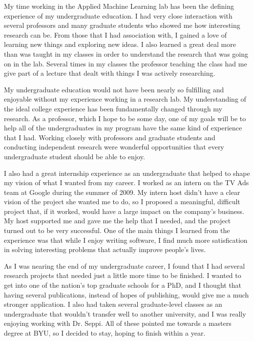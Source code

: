 \documentclass[onecolumn, 12pt]{article}
\begin{document}
My time working in the Applied Machine Learning lab has been the defining
experience of my undergraduate education.  I had very close interaction with
several professors and many graduate students who showed me how interesting
research can be.  From those that I had association with, I gained a love of
learning new things and exploring new ideas.  I also learned a great deal more
than was taught in my classes in order to understand the research that was
going on in the lab.  Several times in my classes the professor teaching the
class had me give part of a lecture that dealt with things I was actively
researching.  

My undergraduate education would not have been nearly so fulfilling and
enjoyable without my experience working in a research lab.  My understanding of
the ideal college experience has been fundamentally changed through my
research.  As a professor, which I hope to be some day, one of my goals will be
to help all of the undergraduates in my program have the same kind of
experience that I had.  Working closely with professors and graduate students
and conducting independent research were wonderful opportunities that every
undergraduate student should be able to enjoy.

I also had a great internship experience as an undergraduate that helped to
shape my vision of what I wanted from my career.  I worked as an intern on the
TV Ads team at Google during the summer of 2009.  My intern host didn't have a
clear vision of the project she wanted me to do, so I proposed a meaningful,
difficult project that, if it worked, would have a large impact on the
company's business.  My host supported me and gave me the help that I needed,
and the project turned out to be very successful.  One of the main things I
learned from the experience was that while I enjoy writing software, I find
much more satisfication in solving interesting problems that actually improve
people's lives.

As I was nearing the end of my undergraduate career, I found that I had several
research projects that needed just a little more time to be finished.  I wanted
to get into one of the nation's top graduate schools for a PhD, and I thought
that having several publications, instead of hopes of publishing, would give me
a much stronger application.  I also had taken several graduate-level classes
as an undergraduate that wouldn't transfer well to another university, and I
was really enjoying working with Dr. Seppi.  All of these pointed me towards a
masters degree at BYU, so I decided to stay, hoping to finish within a year.
\end{document}
